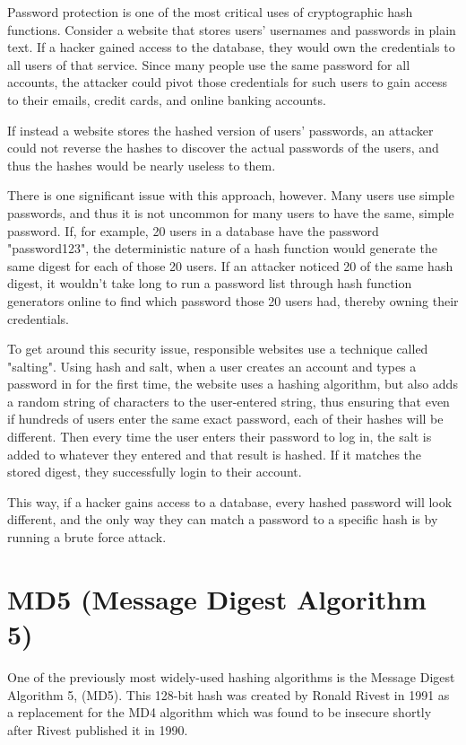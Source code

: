 \documentclass{article}
\begin{document}
Password protection is one of the most critical uses of cryptographic hash functions. Consider a website that stores users' usernames and passwords in plain text. If a hacker gained access to the database, they would own the credentials to all users of that service. Since many people use the same password for all accounts, the attacker could pivot those credentials for such users to gain access to their emails, credit cards, and online banking accounts. 

If instead a website stores the hashed version of users' passwords, an attacker could not reverse the hashes to discover the actual passwords of the users, and thus the hashes would be nearly useless to them.

There is one significant issue with this approach, however. Many users use simple passwords, and thus it is not uncommon for many users to have the same, simple password. If, for example, 20 users in a database have the password "password123", the deterministic nature of a hash function would generate the same digest for each of those 20 users. If an attacker noticed 20 of the same hash digest, it wouldn't take long to run a password list through hash function generators online to find which password those 20 users had, thereby owning their credentials. 

To get around this security issue, responsible websites use a technique called "salting". Using hash and salt, when a user creates an account and types a password in for the first time, the website uses a hashing algorithm, but also adds a random string of characters to the user-entered string, thus ensuring that even if hundreds of users enter the same exact password, each of their hashes will be different. Then every time the user enters their password to log in, the salt is added to whatever they entered and that result is hashed. If it matches the stored digest, they successfully login to their account. 

This way, if a hacker gains access to a database, every hashed password will look different, and the only way they can match a password to a specific hash is by running a brute force attack. 


\section{MD5 (Message Digest Algorithm 5)}
\tab One of the previously most widely-used hashing algorithms is the Message Digest Algorithm 5, (MD5). This 128-bit hash was created by Ronald Rivest in 1991 as a replacement for the MD4 algorithm which was found to be insecure shortly after Rivest published it in 1990. 
\end{document}
